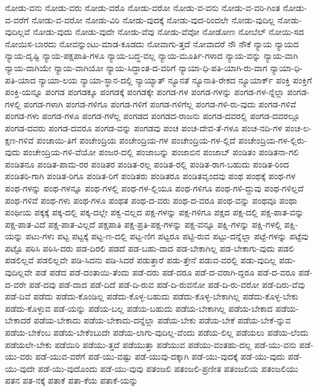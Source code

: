 {ನೋಡು-ವನು
ನೋಡು-ವರು
ನೋಡು-ವರೊ
ನೋಡು-ವರೋ
ನೋಡು-ವ-ವನು
ನೋಡು-ವ-ವರಿ-ಗಿಂತ
ನೋಡು-ವ-ವರೆಗೆ
ನೋಡು-ವ-ವರೋ
ನೋಡು-ವಿರಿ
ನೋಡು-ವುದಕ್ಕೆ
ನೋಡು-ವುದ-ರಿಂದಲೇ
ನೋಡು-ವುದಿಲ್ಲ
ನೋಡು-ವುದಿಲ್ಲವೆ
ನೋಡು-ವುದು
ನೋಡು-ವುದೇ
ನೋಡು-ವೆವು
ನೋಡು-ವೆವೋ
ನೋಡೋಣ
ನೋಬೆಲ್
ನೋಯಿ-ಸದ
ನೋಯಿಸ-ಬಾರದು
ನೋವನ್ನುಂಟು-ಮಾಡ-ಕೂಡದು
ನೋವಾಗು-ತ್ತದೆ
ನೋವಾದರೆ
ನೌ
ನೌಕೆ
ನ್ಯಾಯ
ನ್ಯಾಯದ
ನ್ಯಾಯ-ದೃಷ್ಟಿ
ನ್ಯಾಯ-ಪಕ್ಷಪಾತಿ-ಗಳೂ
ನ್ಯಾಯ-ಬದ್ಧ-ವಲ್ಲ
ನ್ಯಾಯ-ಮೂರ್ತಿ-ಗಳಾದ
ನ್ಯಾಯ-ವನ್ನು
ನ್ಯಾಯ-ವಾಗಿ
ನ್ಯಾಯ-ವಾಗಿಯೇ
ನ್ಯಾಯ-ವಾಗಿಯೋ
ನ್ಯಾಯ-ಸಿದ್ಧಾಂತ-ದ-ವರಿಗೆ
ನ್ಯಾಯಾ-ಧಿ-ಪತಿ-ಯಾಗಿ-ರು-ವಾಗ
ನ್ಯಾಯಾ-ಧಿ-ಪತಿ-ಯಾದ
ನ್ಯಾಯಾ-ಲಯ
ನ್ಯಾಯಾ-ಸ್ಥಾನ-ದಲ್ಲಿ
ನ್ಯಾಯ್ಯಾತ್
ನ್ಯೂನತೆ
ನ್ಯೂನಾತಿ-ರೇಕದ
ನ್ಯೂಯಾರ್ಕ್
ಪಂಕ್ತಿ
ಪಂಕ್ತಿಗೆ
ಪಂಕ್ತಿ-ಯನ್ನೂ
ಪಂಗಡ
ಪಂಗಡಕ್ಕೂ
ಪಂಗಡಕ್ಕೆ
ಪಂಗಡಕ್ಕೇ
ಪಂಗಡ-ಗಳ
ಪಂಗಡ-ಗಳನ್ನು
ಪಂಗಡ-ಗಳ-ನ್ನೆಲ್ಲಾ
ಪಂಗಡ-ಗಳಲ್ಲಿ
ಪಂಗಡ-ಗಳಾಗಿ
ಪಂಗಡ-ಗಳಿಗೂ
ಪಂಗಡ-ಗಳಿಗೆ
ಪಂಗಡ-ಗಳಿಗೆಲ್ಲ
ಪಂಗಡ-ಗಳಿ-ರು-ವುದು
ಪಂಗಡ-ಗಳಿವೆ
ಪಂಗಡ-ಗಳು
ಪಂಗಡ-ಗಳೂ
ಪಂಗಡ-ಗಳೆಲ್ಲ
ಪಂಗಡದ
ಪಂಗಡದ-ರಾಜನು
ಪಂಗಡ-ದವರಲ್ಲಿ
ಪಂಗಡ-ದವರಲ್ಲೂ
ಪಂಗಡ-ದವರು
ಪಂಗಡ-ದವರೂ
ಪಂಗಡ-ವನ್ನು
ಪಂಗಡವು
ಪಂಚ
ಪಂಚ-ದೇವ-ತೆ-ಗಳೂ
ಪಂಚ-ನದಿ-ಗಳ
ಪಂಚ-ಲ-ಕ್ಷಣ-ಗಳಿವೆ
ಪಂಚಾಯಿ-ತಿಗೆ
ಪಂಚೇಂದ್ರಿಯ
ಪಂಚೇಂದ್ರಿಯ-ಗಳ
ಪಂಚೇಂದ್ರಿಯ-ಗಳ-ಲ್ಲಿದೆ
ಪಂಚೇಂದ್ರಿಯ-ಗಳ-ಲ್ಲಿರು-ವುದು
ಪಂಚೇಂದ್ರಿಯ-ಗಳಿ-ವೆಯೋ
ಪಂಜರ-ದಲ್ಲಿ
ಪಂಜಾಬನ್ನು
ಪಂಜಾಬಿನ
ಪಂಜಾಬ್
ಪಂಡಿತಂ
ಪಂಡಿತನಾ-ಗಲಿ
ಪಂಡಿತನೂ
ಪಂಡಿತ-ಪಾಮ-ರರ
ಪಂಡಿತರ
ಪಂಡಿತ-ರಲ್ಲ
ಪಂಡಿತ-ರಲ್ಲಿ
ಪಂಡಿತ-ರಾಗ-ಬಹುದು
ಪಂಡಿತ-ರಿಂದ
ಪಂಡಿತರಿ-ಗಾಗಿ
ಪಂಡಿತ-ರಿಗೂ
ಪಂಡಿತ-ರಿಗೆ
ಪಂಡಿತರು
ಪಂಡಿತರೂ
ಪಂಡಿತವೃಂದವು
ಪಂಥ
ಪಂಥಕ್ಕೆ
ಪಂಥ-ಗಳ
ಪಂಥ-ಗಳನ್ನು
ಪಂಥ-ಗಳನ್ನೂ
ಪಂಥ-ಗಳಲ್ಲಿ
ಪಂಥ-ಗಳ-ಲ್ಲಿಯೂ
ಪಂಥ-ಗಳಿಗೂ
ಪಂಥ-ಗಳಿ-ದ್ದುವು
ಪಂಥ-ಗಳಿಲ್ಲದೆ
ಪಂಥ-ಗಳಿವೆ
ಪಂಥ-ಗಳು
ಪಂಥ-ಗಳೂ
ಪಂಥತ
ಪಂಥ-ದ-ವರು
ಪಂಥ-ದ-ವರೂ
ಪಂಥ-ವನ್ನು
ಪಂಥವೂ
ಪಂಥಾ
ಪಂಥೀಯ
ಪಕ್ಕಕ್ಕೆ
ಪಕ್ಕ-ದಲ್ಲಿ
ಪಕ್ಕ-ದಲ್ಲೇ
ಪಕ್ವ-ವಲ್ಲದ
ಪಕ್ಷ-ಗಳನ್ನು
ಪಕ್ಷ-ಗಳಿಗೂ
ಪಕ್ಷದ
ಪಕ್ಷ-ದಲ್ಲಿ
ಪಕ್ಷ-ಪಾತ-ವನ್ನು
ಪಕ್ಷ-ಪಾತ-ವಿದೆ
ಪಕ್ಷ-ಪಾತ-ವಿಲ್ಲದೆ
ಪಕ್ಷಪಾತಿ
ಪಕ್ಷ-ಪ್ರತಿ-ಪಕ್ಷ-ಗಳನ್ನು
ಪಕ್ಷ-ವನ್ನೂ
ಪಕ್ಷಿ-ಗಳನ್ನು
ಪಕ್ಷಿ-ಗಳಲ್ಲಿ
ಪಕ್ಷಿ-ಯನ್ನು
ಪಟು-ಗಳು
ಪಟ್ಟ
ಪಟ್ಟಕ್ಕೆ
ಪಟ್ಟ-ಣ-ದಲ್ಲಿ
ಪಟ್ಟ-ಣಿಗ
ಪಟ್ಟರೂ
ಪಟ್ಟಿ-ರುವ
ಪಟ್ಟು-ದನ್ನೆಲ್ಲಾ
ಪಟ್ಟೆ-ಗಳನ್ನು
ಪಟ್ಟೆವು
ಪಟ್ಟೊ
ಪಠಿಸಿ
ಪಠಿಸಿ-ದರು
ಪಡ-ದಿರಲಿ
ಪಡದೆ
ಪಡ-ಬಹು-ದಾದ
ಪಡ-ಬೇಕಾಗಿಲ್ಲ
ಪಡ-ಬೇಕಾಗು-ವುದು
ಪಡಲಿ
ಪಡಲಿಲ್ಲವೆ
ಪಡಲಿಲ್ಲವೇ
ಪಡಿ-ಸಿದನು
ಪಡಿ-ಸಿದರೆ
ಪಡುತ್ತಾರೆ
ಪಡು-ತ್ತೇನೆ
ಪಡುವ-ವರಲ್ಲಿ
ಪಡು-ವುದಿಲ್ಲ
ಪಡು-ವುದಿಲ್ಲವೇ
ಪಡೆ
ಪಡೆದ
ಪಡೆ-ದಂತಾಯಿ-ತೆಂದು
ಪಡೆ-ದರು
ಪಡೆ-ದರೂ
ಪಡೆ-ದ-ವರಾಗಿ-ದ್ದರೂ
ಪಡೆ-ದ-ವರೂ
ಪಡೆ-ದ-ವರೇ
ಪಡೆ-ದವು
ಪಡೆ-ದಾದ
ಪಡೆ-ದಿದೆ
ಪಡೆ-ದಿ-ರುವ
ಪಡೆ-ದಿ-ರುವನೋ
ಪಡೆ-ದಿ-ರು-ವರೋ
ಪಡೆ-ದಿರು-ವೆವು
ಪಡೆ-ದಿವೆ
ಪಡೆದು
ಪಡೆದು-ಕೊಂಡಿಲ್ಲ
ಪಡೆದು-ಕೊಳ್ಳ-ಬಹುದು
ಪಡೆದು-ಕೊಳ್ಳ-ಬೇಕಾಗಿಲ್ಲ
ಪಡೆದು-ಕೊಳ್ಳ-ಬೇಕು
ಪಡೆದು-ಕೊಳ್ಳುವ
ಪಡೆ-ಯನ್ನು
ಪಡೆಯ-ಬಲ್ಲ
ಪಡೆಯ-ಬಹುದು
ಪಡೆಯ-ಬೇಕಾಗಿಲ್ಲ
ಪಡೆಯ-ಬೇಕಾದ
ಪಡೆಯ-ಬೇಕಾದರೆ
ಪಡೆಯ-ಬೇಕಾದು
ಪಡೆಯ-ಬೇಕಾದು-ದನ್ನೆಲ್ಲಾ
ಪಡೆಯ-ಬೇಕು
ಪಡೆಯ-ಬೇಕೆ
ಪಡೆಯ-ಬೇಕೆ-ನ್ನುವ
ಪಡೆಯ-ಬೇಕೆಂಬ
ಪಡೆಯ-ಬೇಕೆಂಬುದೇ
ಪಡೆಯ-ಲಾಗು-ವುದಿಲ್ಲ-ವೆಂದು
ಪಡೆಯ-ಲಿಲ್ಲ
ಪಡೆಯಲು
ಪಡೆಯ-ಲೆಂದು
ಪಡೆಯಲೇ-ಬೇಕು
ಪಡೆಯಿರಿ
ಪಡೆಯು-ತ್ತದೆ
ಪಡೆಯುತ್ತಾ
ಪಡೆಯುವ
ಪಡೆಯು-ವಂತಹು-ದಲ್ಲ
ಪಡೆ-ಯು-ವನು
ಪಡೆ-ಯು-ವರು
ಪಡೆ-ಯುವ-ವರೆಗೆ
ಪಡೆ-ಯು-ವಷ್ಟು
ಪಡೆ-ಯುವು-ದಕ್ಕಾಗಿ
ಪಡೆ-ಯು-ವುದಕ್ಕೆ
ಪಡೆ-ಯು-ವುದು
ಪಡೆ-ಯು-ವುದೇ
ಪಡೆ-ಯು-ವುದೊಂದು
ಪಡೆ-ಯು-ವುವು
ಪತಂಜಲಿ
ಪತಂಜಲಿ-ಪ್ರಣೀತ
ಪತಂಜಲಿಯ
ಪತಂಜಲಿಯು
ಪತನ
ಪತ-ನಕ್ಕೆ
ಪತಾಕೆ
ಪತಾ-ಕೆಯ
ಪತಾಕೆ-ಯನ್ನು
}
